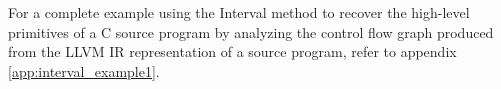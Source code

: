 
For a complete example using the Interval method to recover the high-level primitives
of a C source program by analyzing the control flow graph produced from the LLVM IR
representation of a source program, refer to appendix \ref{app:interval_example1}.
